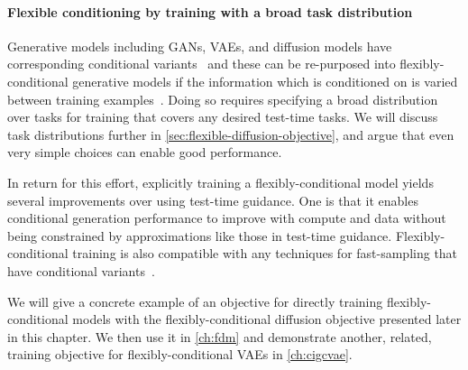 \paragraph{Flexible conditioning by training with a broad task distribution}
Generative models including GANs, VAEs, and diffusion models have corresponding conditional variants~\citep{mirza2014conditional,sohn2015learning,tashiro2021csdi} and these can be re-purposed into flexibly-conditional generative models if the information which is conditioned on is varied between training examples~\citep{zhao2021large,ivanov2018variational,tashiro2021csdi}. Doing so requires specifying a broad distribution over tasks for training that covers any desired test-time tasks. We will discuss task distributions further in \cref{sec:flexible-diffusion-objective}, and argue that even very simple choices can enable good performance. 

In return for this effort, explicitly training a flexibly-conditional model yields several improvements over using test-time guidance. One is that it enables conditional generation performance to improve with compute and data without being constrained by approximations like those in test-time guidance. Flexibly-conditional training is also compatible with any techniques for fast-sampling that have conditional variants~\citep{salimans2022progressive,song2023consistency,esser2024scaling}. 

We will give a concrete example of an objective for directly training flexibly-conditional models with the flexibly-conditional diffusion objective presented later in this chapter. We then use it in \cref{ch:fdm} and demonstrate another, related, training objective for flexibly-conditional VAEs in \cref{ch:cigcvae}.

